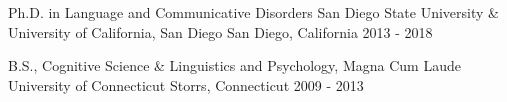 

\begin{cventries}

  \iffalse %
  \cventry %
    {Degree}
    {Institution}
    {Location}
    {Mo. YEAR - Mo. YEAR} %
    {
      \begin{cvitems}
        \item {Description(s) bullet points}
      \end{cvitems}
    }
  \fi

  \cventry 
    {Ph.D. in Language and Communicative Disorders} %
    {San Diego State University \& University of California, San Diego} %
    {San Diego, California} %
    {2013 - 2018} %
    {}

  \cventry 
    {B.S., Cognitive Science \& Linguistics and Psychology, Magna Cum Laude} %
    {University of Connecticut} %
    {Storrs, Connecticut} %
    {2009 - 2013} %
    {} 

\end{cventries}
